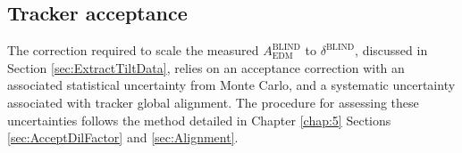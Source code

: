 \subsection{Tracker acceptance}\label{sec:AcceptanceSyst}

The correction required to scale the measured $A_{\text{EDM}}^{\text{BLIND}}$ to $\delta^{\text{BLIND}}$, discussed in Section \ref{sec:ExtractTiltData}, relies on an acceptance correction with an associated statistical uncertainty from Monte Carlo, and a systematic uncertainty associated with tracker global alignment. The procedure for assessing these uncertainties follows the method detailed in Chapter \ref{chap:5} Sections \ref{sec:AcceptDilFactor} and \ref{sec:Alignment}. 

\begin{figure}[t!]
\centering{}
\hfill
{}

\end{figure}
